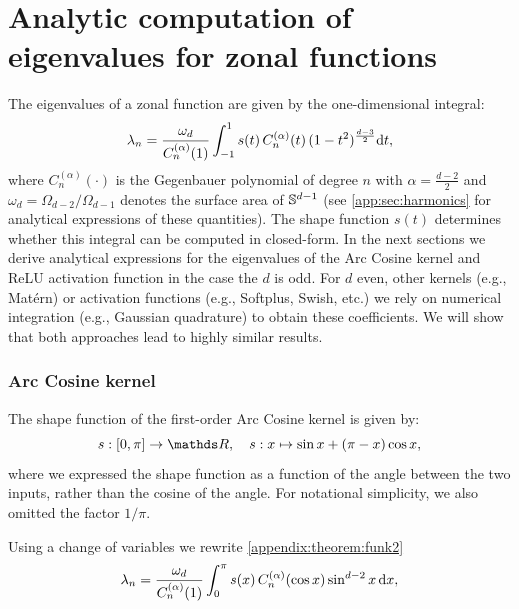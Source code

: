
\chapter{Analytic computation of eigenvalues for zonal functions}
\label{app:sec:compute-eigenvalues}


The eigenvalues of a zonal function are given by the one-dimensional integral:
\begin{equation}
    \label{appendix:theorem:funk2}
    \lambda_{n} = 
   \frac{\omega_{d}}{C_n^{(\alpha)}(1)} \int_{-1}^1 s(t)\,C_n^{(\alpha)}(t)\,(1 - t^2)^{\frac{d-3}{2}} \mathrm{d}{t},
\end{equation}
where $C_n^{(\alpha)}(\cdot)$ is the Gegenbauer polynomial of degree $n$ with $\alpha = \frac{d-2}{2}$ and $\omega_{d} = \Omega_{d-2} / \Omega_{d-1}$ denotes the surface area of $\mathbb{S}^{d-1}$ (see \cref{app:sec:harmonics} for analytical expressions of these quantities). The shape function $s(t)$ determines whether this integral can be computed in closed-form. In the next sections we derive analytical expressions for the eigenvalues of the Arc Cosine kernel and ReLU activation function in the case the $d$ is odd. For $d$ even, other kernels (e.g., Mat\'ern) or activation functions (e.g., Softplus, Swish, etc.) we rely on numerical integration (e.g., Gaussian quadrature) to obtain these coefficients. We will show that both approaches lead to highly similar results.

\subsection{Arc Cosine kernel}
\label{sec:appendix:compute-eigenvalues-arccosine}

The shape function of the first-order Arc Cosine kernel \citep{cho2009kernel} is given by:
\begin{equation}
    s:[0, \pi] \rightarrow \Reals,\quad s: x \mapsto \sin x + (\pi - x) \cos x,
\end{equation}
where we expressed the shape function as a function of the angle between the two inputs, rather than the cosine of the angle. For notational simplicity, we also omitted the factor $1 / \pi$.

Using a change of variables we rewrite \cref{appendix:theorem:funk2}
\begin{equation}
    \lambda_n
    =  \frac{\omega_{d}}{C_n^{(\alpha)}(1)}  \int_{0}^\pi s(x)\,C_n^{(\alpha)}(\cos x) \sin^{d-2} x\,\mathrm{d}{x},
\end{equation}


